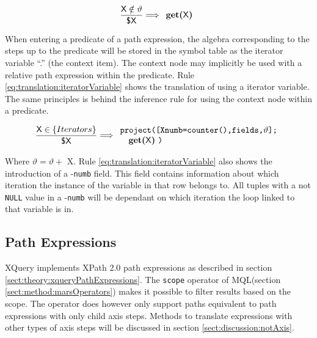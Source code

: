 \begin{equation}
\centering
\frac{\displaystyle \textsf{X} \notin \vartheta}{\displaystyle \textsf{\$X}}
\Longrightarrow
\begin{array}{l}
	\mbox{\textbf{get(}\textsf{X}\textbf{)}}
\end{array}
\label{eq:translation:variableNotIterator}
\end{equation}

When entering a predicate of a path expression, the algebra corresponding to the steps up to the predicate will be
stored in the symbol table as the iterator variable \textsf{``.''} (the context item). The context node may
implicitly be used with a relative path expression within the predicate. Rule
\ref{eq:translation:iteratorVariable} shows the translation of using a iterator variable. The same principles is
behind the inference rule for using the context node within a predicate.

\begin{equation}
\centering
\frac{\displaystyle \textsf{X} \in \left\{ Iterators \right\}}
	{\displaystyle \textsf{\$X}}
\Longrightarrow
\begin{array}{l}
	\mbox{\texttt{project([Xnumb=counter(),fields,}} \vartheta
	\mbox{\texttt{];}}
	\\ \quad
	\mbox{\textbf{get(}\textsf{X}\textbf{)} \texttt{)}}
\end{array}
\label{eq:translation:iteratorVariable}
\end{equation}

Where $\vartheta = \vartheta + $ \textsf{X}.
Rule \ref{eq:translation:iteratorVariable} also shows the introduction of a -\texttt{numb} field. This field
contains information about which iteration the instance of the variable in that row belongs to. All tuples with a
not \texttt{NULL} value in a -\texttt{numb} will be dependant on which iteration the loop linked to that variable
is in.


\subsection{Path Expressions}
\label{sect:translation:mXr:smpPathExpr}
XQuery implements XPath 2.0 path expressions as described in section
\ref{sect:theory:xqueryPathExpressions}. The \texttt{scope} operator of
MQL(section \ref{sect:method:marsOperators}) makes it possible to
filter results based on the scope. The operator does however only support paths
equivalent to path expressions with only \textsf{child} axis steps. Methods to
translate expressions with other types of axis steps will be discussed in
section \ref{sect:discussion:notAxis}.

